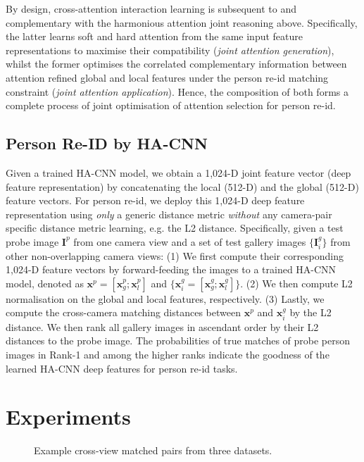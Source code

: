 \documentclass[10pt,twocolumn,letterpaper]{article}
\begin{document}
\vspace{0.01cm}
By design, cross-attention interaction learning is subsequent to and complementary
with the harmonious attention joint reasoning above. Specifically,
the latter learns soft and hard attention from
the same input feature representations to maximise their compatibility 
({\em joint attention generation}), whilst the former 
optimises the correlated complementary information between 
attention refined global and local features 
under the person re-id matching constraint
({\em joint attention application}).
Hence, the composition of both forms a complete process of 
joint optimisation of attention selection
for person re-id.
\subsection{Person Re-ID by HA-CNN}
Given a trained HA-CNN model,
we obtain a 1,024-D joint feature vector (deep feature representation)
by concatenating the local (512-D) and the global (512-D) feature vectors.
For person re-id, we deploy this 1,024-D deep feature representation using {\em only}
a generic distance metric {\em without} any camera-pair specific distance
metric learning, e.g. the L2 distance.
Specifically, given a test probe image $\bm{I}^p$ from one camera view
and a set of test gallery images 
$\{\bm{I}_i^g\}$ from other non-overlapping camera views:
(1) We first compute their corresponding 1,024-D feature vectors by
forward-feeding the images to a trained HA-CNN model, 
denoted as $\bm{x}^p=[\bm{x}_g^p; \bm{x}_l^p]$ and 
$\{\bm{x}_i^g=[\bm{x}_g^g; \bm{x}_l^g]\}$. 
(2) We then compute L2 normalisation on the global and local features,
respectively. 
(3) Lastly, we compute the cross-camera matching
distances between $\bm{x}^p$ and $\bm{x}_i^g$ by the L2 distance. 
We then rank all
gallery images in ascendant order by their L2 distances to the probe image.  
The probabilities of true matches of probe person images in Rank-1 and
among the higher ranks indicate the goodness of the learned
HA-CNN deep features for person re-id tasks. 


\section{Experiments}
\label{exp}
\vspace{-0.3cm}
\begin{figure} [ht]
	\centering
	\vskip -0.1cm
	\caption{ Example cross-view matched pairs from three datasets.
	}
	\label{fig:dataset}
	\vspace{-0.3cm}
\end{figure}
\end{document}

